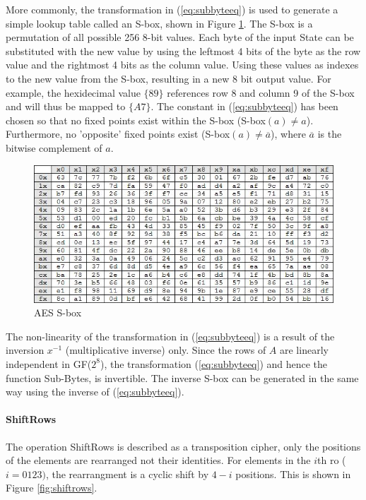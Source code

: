 \documentclass[a4paper,12pt]{report}
\begin{document}
More commonly, the transformation in (\ref{eq:subbyteeq}) is used to generate a simple lookup table called an S-box, shown in Figure \ref{fig:sbox}. The S-box is a permutation of all possible 256 8-bit values. Each byte of the input State can be substituted with the new value by using the leftmost 4 bits of the byte as the row value and the rightmost 4 bits as the column value. Using these values as indexes to the new value from the S-box, resulting in a new 8 bit output value. For example, the hexidecimal value $\{89\}$ references row 8 and column 9 of the S-box and will thus be mapped to $\{A7\}$. The constant in (\ref{eq:subbyteeq}) has been chosen so that no fixed points exist within the S-box (S-box$(a) \neq a $). Furthermore, no 'opposite' fixed points exist (S-box$(a) \neq \overline{a} $), where $\overline{a}$ is the bitwise complement of $a$. 

\begin{figure}[htb]
\centering
\includegraphics[scale=0.5]{images/sbox.jpg}
\caption{AES S-box}
\label{fig:sbox}
\end{figure}

The non-linearity of the transformation in (\ref{eq:subbyteeq}) is a result of the inversion $x^{-1}$ (multiplicative inverse) only. Since the rows of $A$ are linearly independent in GF($2^{8}$), the transformation (\ref{eq:subbyteeq}) and hence the function Sub-Bytes, is invertible. The inverse S-box can be generated in the same way using the inverse of (\ref{eq:subbyteeq}).

\paragraph{ShiftRows}

The operation ShiftRows is described as a transposition cipher, only the positions of the elements are rearranged not their identities. For elements in the $i$th ro ($i = 0 1 2 3)$, the rearrangment is a cyclic shift by $4 - i$ positions. This is shown in Figure \ref{fig:shiftrows}.
\end{document}
